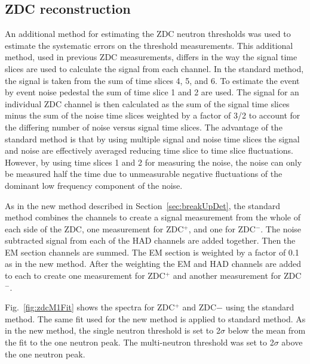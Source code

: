     \subsection{ZDC reconstruction}
      An additional method for estimating the ZDC neutron thresholds was used
        to estimate the systematic errors on the threshold measurements.  
      This additional method, used in previous ZDC measurements, differs 
        in the way the signal time slices are used to calculate the signal from
        each channel.
      In the standard method, the signal is taken from the sum of time slices 
        4, 5, and 6.
      To estimate the event by event noise pedestal the sum of time slice 
        1 and 2 are used. 
      The signal for an individual ZDC channel is then calculated as the 
        sum of the signal time slices minus the sum of the noise time slices
        weighted by a factor of 3/2 to account for the differing number of 
        noise versus signal time slices.
      The advantage of the standard method is that by using multiple signal
        and noise time slices the signal and noise are effectively averaged
        reducing time slice to time slice fluctuations.
      However, by using time slices 1 and 2 for measuring the noise, the noise
        can only be measured half the time due to unmeasurable negative 
        fluctuations of the dominant low frequency component of the noise.
      
      As in the new method described in Section~\ref{sec:breakUpDet}, 
        the standard method combines the channels to create a signal 
        measurement from the whole of each side of the ZDC, one
        measurement for ZDC$^{+}$, and one for ZDC$^{-}$.
      The noise subtracted signal from each of the HAD channels are added 
        together.
      Then the EM section channels are summed. 
      The EM section is weighted by a factor of 0.1 as in the new method. 
      After the weighting the EM and HAD channels are added to each to create
        one measurement for ZDC$^{+}$ and another measurement for ZDC$^{-}$.
    
      Fig.~\ref{fig:zdcM1Fit} shows the spectra for ZDC$^{+}$ and ZDC${-}$ 
        using the standard method. 
      The same fit used for the new method is applied to standard method. 
      As in the new method, the single neutron threshold is set to 2$\sigma$
        below the mean from the fit to the one neutron peak.
      The multi-neutron threshold was set to 2$\sigma$ above the one neutron
        peak.

